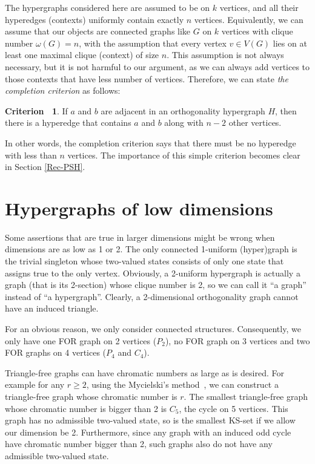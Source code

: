 \documentclass[%
12pt,
prereprint,
showpacs,
showkeys,
preprintnumbers,
amsmath,amssymb,
aps,
pra,
longbibliography,
notitlepage
]{revtex4-1}
\theoremstyle{definition}
\newtheorem{criterion}[theorem]{{\color{THM}Criterion\ }}
\begin{document}
        The hypergraphs considered here are assumed to be on $k$ vertices, and all their hyperedges (contexts) uniformly contain exactly $n$ vertices. Equivalently, we can assume that our objects are connected graphs like $G$ on $k$ vertices with clique number $\omega (G)=n$, with the assumption that every vertex $v\in V(G)$ lies on at least one maximal clique (context) of size $n$. This assumption is not always necessary, but it is not harmful to our argument, as we can always add vertices to those contexts that have less number of vertices. Therefore, we can state \emph{the completion criterion} as follows:

        \begin{criterion}\label{completion}
                If $a$ and $b$ are adjacent in an orthogonality hypergraph $H$, then there is a hyperedge that contains $a$ and $b$ along with $n-2$ other vertices.
        \end{criterion}

        In other words, the completion criterion says that there must be no hyperedge with less than $n$ vertices. The importance of this simple criterion becomes clear in Section \ref{Rec-PSH}.

      \section{Hypergraphs of low dimensions}

        Some assertions that are true in larger dimensions might be wrong when dimensions are as low as 1 or 2. The only connected 1-uniform (hyper)graph is the trivial singleton whose two-valued states consists of only one state that assigns true to the only vertex. Obviously, a 2-uniform hypergraph is actually a graph (that is its 2-section) whose clique number is 2, so we can call it ``a graph'' instead of ``a hypergraph''. Clearly, a 2-dimensional orthogonality graph cannot have an induced triangle.

        For an obvious reason, we only consider connected structures. Consequently, we only have one FOR graph on 2 vertices ($P_2$), no FOR graph on 3 vertices and two FOR graphs on 4 vertices ($P_4$ and $C_4$).

        Triangle-free graphs can have chromatic numbers as large as is desired. For example for any $r\geq 2$, using the Mycielski's method~\cite{Mycielski1955}, we can construct a triangle-free graph whose chromatic number is $r$. The smallest triangle-free graph whose chromatic number is bigger than 2 is $C_5$, the cycle on 5 vertices. This graph has no admissible two-valued state, so is the smallest KS-set if we allow our dimension be 2. Furthermore, since any graph with an induced odd cycle have chromatic number bigger than 2, such graphs also do not have any admissible two-valued state.
\end{document}
